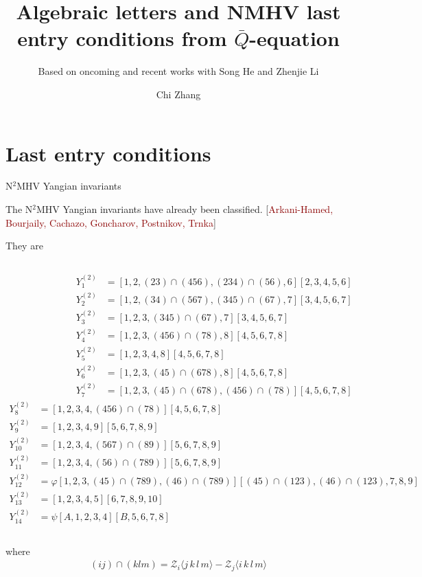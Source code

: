 \documentclass[10pt]{beamer}
\title{Algebraic letters and NMHV last entry conditions from $\bar{Q}$-equation}
\subtitle{\scriptsize Based on oncoming and recent works with Song He and Zhenjie Li}
\author{Chi Zhang}
\institute{Institute of Theoretical Physics, CAS}
\begin{document}
\maketitle




\section{Last entry conditions}


\begin{frame}[t]{N$^{2}$MHV Yangian invariants}


The N$^{2}$MHV Yangian invariants have already been classified. {\footnotesize[\textcolor{darkred}{Arkani-Hamed, Bourjaily, Cachazo, Goncharov, Postnikov, Trnka}]}

They are 
\begin{columns}
  \tiny
  \begin{align*}
    Y^{(2)}_1 &= [1,2,(23)\cap (456), (234) \cap (56) , 6] [2,3,4,5,6] \\
    \nonumber
    Y^{(2)}_2 &= [1,2,(34) \cap (567), (345) \cap (67), 7] [3,4,5,6,7] \\
    \nonumber
    Y^{(2)}_3 &= [1,2,3,(345) \cap (67), 7] [3,4,5,6,7] \\
    \nonumber
    Y^{(2)}_4 &= [1,2,3,(456) \cap (78), 8] [4,5,6,7,8] \\
    \nonumber
    Y^{(2)}_5 &= [1,2,3,4,8] [4,5,6,7,8] \\
    \nonumber
    Y^{(2)}_6 &= [1,2,3,(45) \cap (678), 8] [4,5,6,7,8] \\
    Y^{(2)}_7 &= [1,2,3,(45) \cap (678), (456) \cap (78)] [4,5,6,7,8]
  \end{align*}
  \tiny
  \begin{align*}
    Y^{(2)}_8 &= [1,2,3,4,(456) \cap (78)] [4,5,6,7,8] \\
    \nonumber
    Y^{(2)}_9 &= [1,2,3,4,9] [5,6,7,8,9] \\
    \nonumber
    Y^{(2)}_{10}&=[1,2,3,4,(567) \cap (89)] [5,6,7,8,9] \\
    \nonumber
    Y^{(2)}_{11}&=[1,2,3,4,(56) \cap (789)] [5,6,7,8,9] \\
    \nonumber
    Y^{(2)}_{12}&= \varphi 
    [1,2,3,(45) \cap (789) , (46) \cap (789)] [(45) \cap (123), (46) \cap (123), 7,8,9] \\
    Y^{(2)}_{13}&=[1,2,3,4,5][6,7,8,9,10] \\
    Y^{(2)}_{14}&=\psi [A,1,2,3,4][B,5,6,7,8]
    \nonumber
  \end{align*}
\end{columns}
  where
  \begin{align*}
  (i j) \cap (k l m ) = \mathcal{Z}_i \langle j\, k\, l\, m \rangle - \mathcal{Z}_j \langle i\, k \, l\, m \rangle
  \end{align*}

\end{frame}
\end{document}
